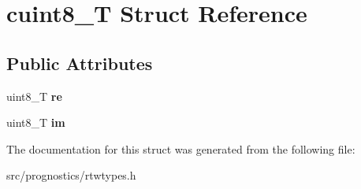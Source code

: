 \hypertarget{structcuint8__T}{}\section{cuint8\+\_\+T Struct Reference}
\label{structcuint8__T}
\subsection*{Public Attributes}
\begin{DoxyCompactItemize}
\item 
\mbox{\label{structcuint8__T_abcb8936a4e848d7e8e034f54f30658ca}} 
uint8\+\_\+T {\bfseries re}
\item 
\mbox{\label{structcuint8__T_af38dd23bf903eb0d14bb8fa9048e0de0}} 
uint8\+\_\+T {\bfseries im}
\end{DoxyCompactItemize}


The documentation for this struct was generated from the following file\+:\begin{DoxyCompactItemize}
\item 
src/prognostics/rtwtypes.\+h\end{DoxyCompactItemize}
